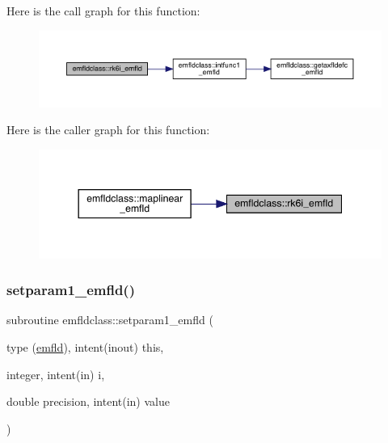 Here is the call graph for this function\+:\nopagebreak
\begin{figure}[H]
\begin{center}
\leavevmode
\includegraphics[width=350pt]{namespaceemfldclass_ae4bfa1325df7cec4a3facbe8ebc66845_cgraph}
\end{center}
\end{figure}
Here is the caller graph for this function\+:\nopagebreak
\begin{figure}[H]
\begin{center}
\leavevmode
\includegraphics[width=344pt]{namespaceemfldclass_ae4bfa1325df7cec4a3facbe8ebc66845_icgraph}
\end{center}
\end{figure}
\mbox{\label{namespaceemfldclass_a89c21ffdad41e63e575b3bc21899f600}} 
\subsubsection{\texorpdfstring{setparam1\_emfld()}{setparam1\_emfld()}}
{\footnotesize\ttfamily subroutine emfldclass\+::setparam1\+\_\+emfld (\begin{DoxyParamCaption}\item[{type (\mbox{\hyperlink{namespaceemfldclass_structemfldclass_1_1emfld}{emfld}}), intent(inout)}]{this,  }\item[{integer, intent(in)}]{i,  }\item[{double precision, intent(in)}]{value }\end{DoxyParamCaption})}

\mbox{\label{namespaceemfldclass_ad425987a9a6e1cb7b0b2b7b1724dc961}} 
